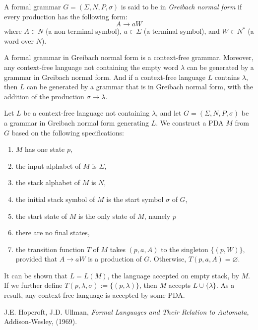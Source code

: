 \documentclass[12pt]{article}
\begin{document}
A formal grammar $G=(\Sigma,N,P,\sigma)$ is said to be in \emph{Greibach normal form} if every production has the following form:
$$A\to aW$$
where $A \in N$ (a non-terminal symbol), $a \in \Sigma$ (a terminal symbol), and $W\in N^*$ (a word over $N$).

A formal grammar in Greibach normal form is a context-free grammar.  Moreover, any context-free language not containing the empty word $\lambda$ can be generated by a grammar in Greibach normal form.  And if a context-free language $L$ contains $\lambda$, then $L$ can be generated by a grammar that is in Greibach normal form, with the addition of the production $\sigma \to \lambda$.

Let $L$ be a context-free language not containing $\lambda$, and let $G=(\Sigma,N,P,\sigma)$ be a grammar in Greibach normal form generating $L$.  We construct a PDA $M$ from $G$ based on the following specifications:
\begin{enumerate}
\item $M$ has one state $p$, 
\item the input alphabet of $M$ is $\Sigma$,
\item the stack alphabet of $M$ is $N$, 
\item the initial stack symbol of $M$ is the start symbol $\sigma$ of $G$,
\item the start state of $M$ is the only state of $M$, namely $p$
\item there are no final states,
\item the transition function $T$ of $M$ takes $(p,a,A)$ to the singleton $\lbrace (p,W)\rbrace$, provided that $A\to aW$ is a production of $G$.  Otherwise, $T(p,a,A)=\varnothing$.
\end{enumerate}
It can be shown that $L=L(M)$, the language accepted on empty stack, by $M$.  If we further define $T(p,\lambda,\sigma):=\lbrace (p,\lambda)\rbrace$, then $M$ accepts $L\cup \lbrace\lambda\rbrace$.  As a result, any context-free language is accepted by some PDA.

\begin{thebibliography}{9}
 J.E. Hopcroft, J.D. Ullman, {\em Formal Languages and Their Relation to Automata}, Addison-Wesley, (1969).
\end{thebibliography}
\end{document}
